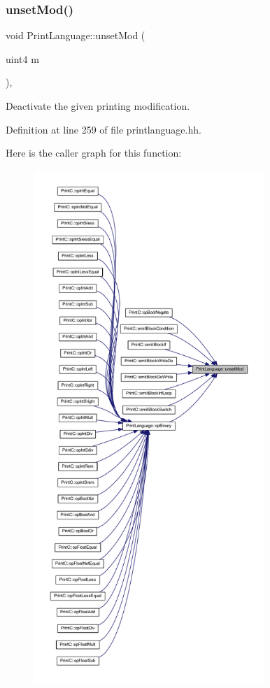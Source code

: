 \subsubsection{\texorpdfstring{unsetMod()}{unsetMod()}}
{\footnotesize\ttfamily void Print\+Language\+::unset\+Mod (\begin{DoxyParamCaption}\item[{uint4}]{m }\end{DoxyParamCaption})\hspace{0.3cm}{\ttfamily [inline]}, {\ttfamily [protected]}}



Deactivate the given printing modification. 



Definition at line 259 of file printlanguage.\+hh.

Here is the caller graph for this function\+:
\nopagebreak
\begin{figure}[H]
\begin{center}
\leavevmode
\includegraphics[height=550pt]{class_print_language_a5cb6bbf5e82586e921fea96051b7123b_icgraph}
\end{center}
\end{figure}
\mbox{\label{class_print_language_af6dd42fe3c5f9941b50b06c0dfeda80c}} 
